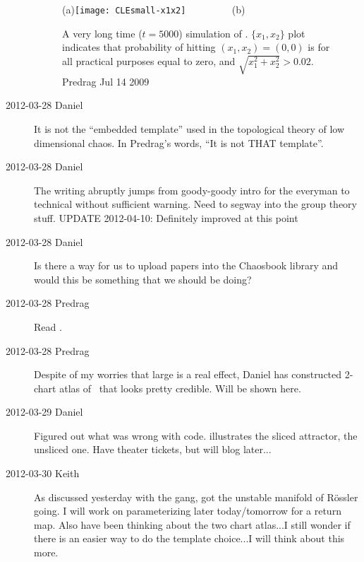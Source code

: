 \begin{description}
 \begin{figure}
 \begin{center}
(a)\texttt{[image: CLEsmall-x1x2]}%
~~~~~~~~
(b) %
 \end{center}
 \caption{\label{fig:CLEsmall-x1x2}
A very long time ($t=5000$) simulation of \cLf. $\{x_1,x_2\}$ plot indicates
that probability of hitting $(x_1,x_2) =(0,0)$ is for all practical purposes
equal to zero, and $\sqrt{x_1^2+x_2^2} > 0.02$.
\hfill Predrag {Jul 14 2009}
}
\end{figure}


\item[2012-03-28 Daniel]                        \toCB
It is not the ``embedded template'' used in the topological theory of low
dimensional chaos. In Predrag's words, ``It is not THAT template''.

\item[2012-03-28 Daniel]
   The writing abruptly jumps from goody-goody intro for the everyman to
   technical without sufficient warning. Need to segway into the group
   theory stuff. UPDATE 2012-04-10: Definitely improved at this point

\item[2012-03-28 Daniel]
Is there a way for us to upload papers into the Chaosbook library and
would this be something that we should be doing?

\item[2012-03-28 Predrag] Read .

\item[2012-03-28 Predrag] Despite of my worries that
large {\phaseVel} is a real effect, Daniel has constructed 2-chart
atlas of \cLe\ that looks pretty credible. Will be shown here.

\item[2012-03-29 Daniel] Figured out what was wrong with code.
 illustrates the sliced attractor,
 the unsliced one. Have theater tickets, but will
blog later...

\item[2012-03-30 Keith] As discussed yesterday with the gang, got the
unstable manifold of R\"ossler going.  I will work on parameterizing later
today/tomorrow for a return map.  Also have been thinking about the two
chart atlas...I still wonder if there is an easier way to do the template
choice...I will think about this more.


\end{description}

